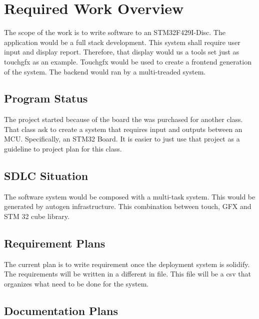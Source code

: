 
\chapter{Required Work Overview}
\label{loc:RequiredWorkOverview}
% 

The scope of the work is to write software to an STM32F429I-Disc. The application would be a full stack development. This system shall require user input and display report. Therefore, that display would us a tools set just as touchgfx as an example.
Touchgfx would be used to create a frontend generation of the system. The backend would ran by a multi-treaded system.

\section{Program Status}
\label{loc:RWO_ProgramStatus}
% 

The project started because of the board the was purchased for another class. That class ask to create a system that requires input and outputs between an MCU. Specifically, an STM32 Board. 
It is easier to just use that project as a guideline to project plan for this class.


\section{SDLC Situation}
\label{loc:RWO_SDLC}
% 

The software system would be composed with a multi-task system.	This would be generated by autogen infrastructure. This combination between touch, GFX and STM 32 cube library.


\section{Requirement Plans}
\label{loc:RWO_RequirementPlans}
% 

The current plan is to write requirement once the deployment system is solidify. The requirements will be written in a different in file. 
This file will be a csv that organizes what need to be done for the system.


\section{Documentation Plans}
\label{loc:RWO_DocumentationPlans}
% 

